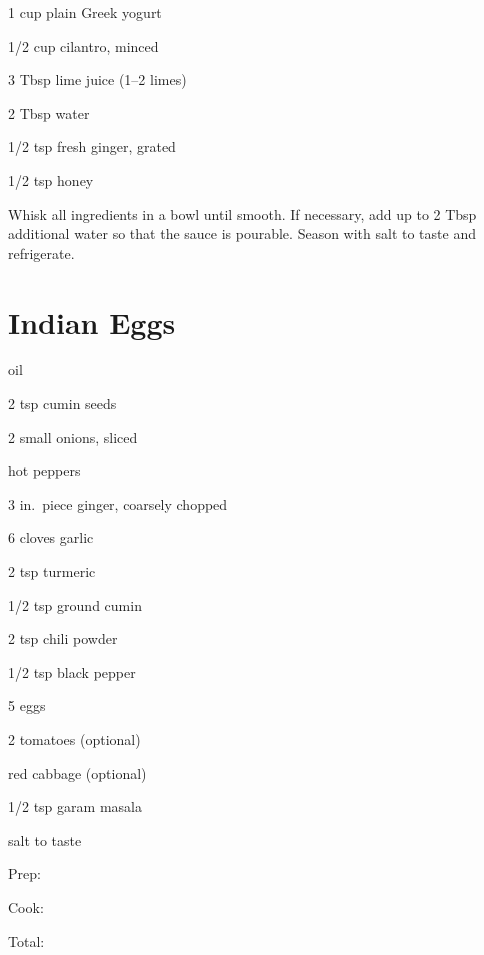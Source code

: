 \documentclass[oneside]{book}  %
\def\thisrecipe{}  %
\newcommand{\recipe}[1]{\section{#1}\def\thisrecipe{: #1}} %
\newcommand{\itemNL}{\item[] \hspace{-\labelsep}}  %
\begin{document}
\smallskip

\begin{twocols}
  \begin{ingredients}
    \item[1 cup] plain Greek yogurt
    \item[1/2 cup] cilantro, minced
    \item[3 Tbsp] lime juice (1--2 limes)
    \item[2 Tbsp] water
    \item[1/2 tsp] fresh ginger, grated
    \item[1/2 tsp] honey
  \end{ingredients}

  \columnbreak

  \begin{directions1col}
  \item Whisk all ingredients in a bowl until smooth. If necessary, add up to 2
    Tbsp additional water so that the sauce is pourable. Season with salt to
    taste and refrigerate.
  \end{directions1col}
\end{twocols}
\recipe{Indian Eggs} \label{recipe:indian_eggs} %

\begin{IT}
  \begin{ingredients}
    \itemNL oil
    \item[2 tsp] cumin seeds
    \item[2 small] onions, sliced
    \itemNL hot peppers
    \item[3 in.\ piece] ginger, coarsely chopped
    \item[6 cloves] garlic
    \item[2 tsp] turmeric
    \item[1/2 tsp] ground cumin
    \item[2 tsp] chili powder
    \item[1/2 tsp] black pepper
    \item[5] eggs
    \item[2] tomatoes (optional)
    \itemNL red cabbage (optional)
    \item[1/2 tsp] garam masala
    \itemNL salt to taste
  \end{ingredients}

  \switchcolumn

  \begin{timeline}
    \item[Prep:]  \todo
    \item[Cook:]  \todo
    \item[Total:] \todo
  \end{timeline}
\end{IT}
\end{document}
